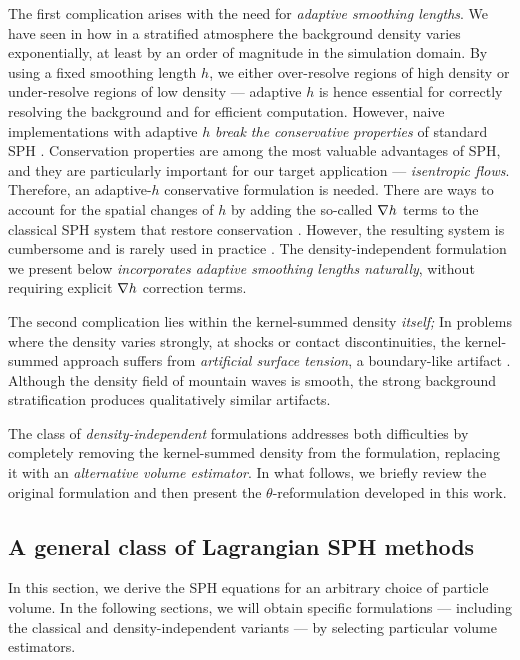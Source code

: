 \documentclass[../main.tex]{subfiles}
\begin{document}
The first complication arises with the need for \emph{adaptive smoothing lengths}. We have seen in  how in a stratified atmosphere the background density varies exponentially, at least by an order of magnitude in the simulation domain. By using a fixed smoothing length $h$, we either over-resolve regions of high density or under-resolve regions of low density --- adaptive $h$ is hence essential for correctly resolving the background and for efficient computation.
However, naive implementations with adaptive $h$ \emph{break the conservative properties} of standard SPH \autocite{hernquistCautionaryRemarksSmoothed1993,nelsonVariableSmoothingLengths1994}. Conservation properties are among the most valuable advantages of SPH, and they are particularly important for our target application --- \emph{isentropic flows}. Therefore, an adaptive-$h$ conservative formulation is needed. There are ways to account for the spatial changes of $h$ by adding the so-called $\nabla h$ terms to the classical SPH system that restore conservation \autocite{nelsonThreedimensionalHydrodynamicSimulations1993,nelsonVariableSmoothingLengths1994}. However, the resulting system is cumbersome and is rarely used in practice \autocite[p.~4]{springelCosmologicalSPHSimulations2002}. The density-independent formulation we present below \emph{incorporates adaptive smoothing lengths naturally}, without requiring explicit $\nabla h$ correction terms.

The second complication lies within the kernel-summed density \emph{itself;} In problems where the density varies strongly, \eg at shocks or contact discontinuities, the kernel-summed approach suffers from \emph{artificial surface tension}, a boundary-like artifact \autocite{hopkinsGeneralClassLagrangian2013a}. Although the density field of mountain waves is smooth, the strong background stratification produces qualitatively similar artifacts.

The class of \emph{density-independent} formulations \autocite{saitohDensityIndependentFormulation2013,hopkinsGeneralClassLagrangian2013a} addresses both difficulties by completely removing the kernel-summed density from the formulation, replacing it with an \emph{alternative volume estimator}. In what follows, we briefly review the original formulation and then present the $\theta$-reformulation developed in this work. 

\subsection{A general class of Lagrangian SPH methods}
\label{sec:GENERAL-CLASS}
In this section, we derive the SPH equations for an arbitrary choice of particle volume. In the following sections, we will obtain specific formulations --- including the classical and density-independent variants --- by selecting particular volume estimators.
\end{document}
